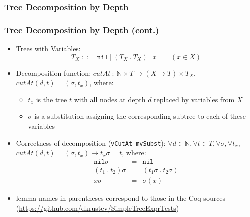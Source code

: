 \documentclass{beamer}
\begin{document}
\begin{frame}[fragile]
  \frametitle{Tree Decomposition by Depth}
  \begin{figure}
  \centering
  \end{figure}
\end{frame}

\begin{frame}
  \frametitle{Tree Decomposition by Depth (cont.)}
  \begin{itemize}
    \item Trees with Variables:
	  \[
		T_X ~::=~ \texttt{nil} ~|~ (T_X ~.~ T_X) ~|~ x \qquad (x \in X)
	  \]
    \item Decomposition function: 
      $\mathit{cutAt} ~:~ \mathbb{N} \times T \rightarrow (X \rightarrow T) \times T_X$,
      $cutAt(d, t) = (\sigma, t_x)$, where:
      \begin{itemize}
	    \item $t_x$ is the tree $t$ with all nodes at depth $d$ replaced by variables from $X$
	    \item $\sigma$ is a substitution assigning the corresponding subtree to each of these variables
	  \end{itemize}
	\item Correctness of decomposition (\texttt{vCutAt\_mvSubst}): 
	  $\forall d \in \mathbb{N}, \forall t \in T, \forall \sigma, \forall t_x,$
	  $cutAt(d, t) = (\sigma, t_x) \rightarrow t_x \sigma = t$, where:
	  \[\begin{array}{lcl}
	    \texttt{nil} \sigma & = & \texttt{nil} \\
	    (t_1 ~.~ t_2) \sigma & = & (t_1 \sigma ~.~ t_2 \sigma) \\
	    x \sigma & = & \sigma(x)
	  \end{array}
	  \]
	\item lemma names in parentheses correspond to those in the Coq sources
	  (\url{https://github.com/dkrustev/SimpleTreeExprTests})
  \end{itemize}
\end{frame}
\end{document}
